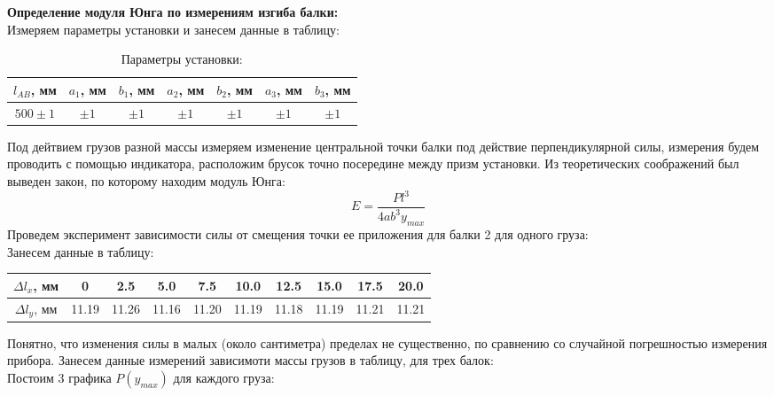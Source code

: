 \documentclass[a4paper,12pt]{article}
\begin{document}
		

\large{\textbf{Определение модуля Юнга по измерениям изгиба балки:}}\\
Измеряем параметры установки и занесем данные в таблицу:
\begin{table}
\caption{Параметры установки:}
\begin{center}
\begin{tabular}{|c|c|c|c|c|c|c|}

\hline 
\rule[-1ex]{0pt}{2.5ex} \(l_{AB}\), мм & \(a_1\), мм & \(b_1\), мм & \(a_2\), мм & \(b_2\), мм & \(a_3\), мм & \(b_3\), мм \\ 
\hline 
\rule[-1ex]{0pt}{2.5ex} \(500 \pm 1\) & \( \pm 1\) & \( \pm 1\) & \( \pm 1\) & \( \pm 1\) & \( \pm 1\) & \( \pm 1\) \\ 
\hline 
\end{tabular}
\end{center}
\end{table} 
Под дейтвием грузов разной массы измеряем изменение центральной точки балки под действие перпендикулярной силы, измерения будем проводить с помощью индикатора, расположим брусок точно посередине между призм установки. Из теоретических соображений был выведен закон, по которому находим модуль Юнга:
\[E = \dfrac{Pl^3}{4 a b^3 y_{max}}\]
Проведем эксперимент зависимости силы от смещения точки ее приложения для балки 2 для одного груза:\\
Занесем данные в таблицу:\\

\begin{tabular}{|c|c|c|c|c|c|c|c|c|c|}
\hline 
\( \Delta l_x \), мм & 0 & 2.5 & 5.0 & 7.5 & 10.0 & 12.5 & 15.0 & 17.5 & 20.0 \\ 
\hline 
\( \Delta l_y \), мм & 11.19 & 11.26 & 11.16 & 11.20 & 11.19 & 11.18 & 11.19 & 11.21 & 11.21 \\ 
\hline 
\end{tabular}

Понятно, что изменения силы в малых (около сантиметра) пределах не существенно, по сравнению со случайной погрешностью измерения прибора. 
Занесем данные измерений зависимоти массы грузов в таблицу, для трех балок:\\

 

Постоим 3 графика \(P(y_{max})\) для каждого груза:\\
\end{document}
